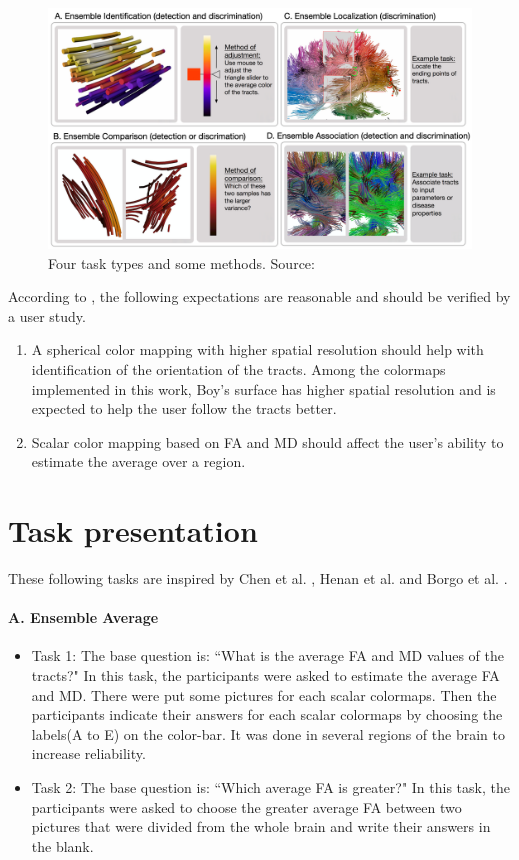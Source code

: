 \documentclass[a4paper, 12pt]{report}
\begin{document}
\begin{figure}[ht]
    \centering
    \includegraphics[width = 0.9\columnwidth]{task-types}
    \caption{Four task types and some methods. Source:  \cite{chen}}
    \label{fig:task-types}
\end{figure}

According to \cite{chen}, the following expectations are reasonable and should be verified by a user study.
\begin{enumerate}
	\item A spherical color mapping with higher spatial resolution should help with identification of the orientation of the tracts. Among the colormaps implemented in this work, Boy's surface has higher spatial resolution and is expected to help the user follow the tracts better.
	\item Scalar color mapping based on FA and MD should affect the user's ability to estimate the average over a region.
\end{enumerate}

\section{Task presentation}
These following tasks are inspired by Chen et al. \cite{chen}, Henan et al. \cite{henan} and Borgo et al. \cite{borgo}.

\paragraph{A. Ensemble Average}

\begin{itemize}
	\item{Task 1:} The base question is: ``What is the average FA and MD values of the tracts?"
	In this task, the participants were asked to estimate the average FA and MD. There were put some pictures for each scalar colormaps. Then the participants indicate their answers for each scalar colormaps by choosing the labels(A to E) on the color-bar. It was done in several regions of the brain to increase reliability. 
	
	
	\item{Task 2:} The base question is: ``Which average FA is greater?"
	In this task, the participants were asked to choose the greater average FA between two pictures that were divided from the whole brain and write their answers in the blank. 
	
\end{itemize}
\end{document}
